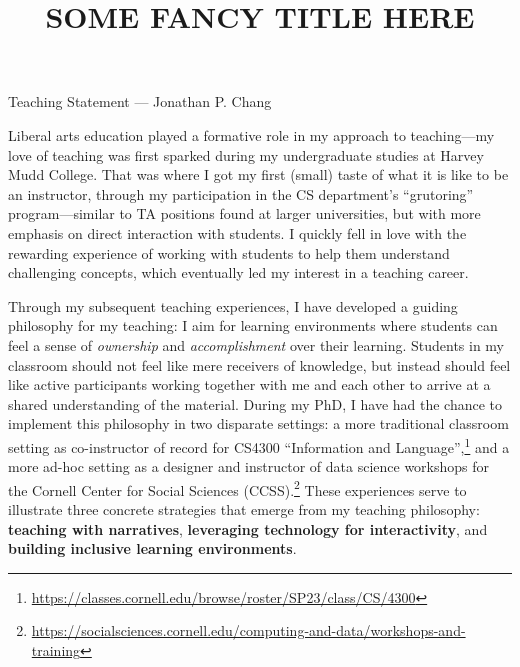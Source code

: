 \documentclass[12pt,letterpaper]{article}
\title{SOME FANCY TITLE HERE}
\begin{document}
\maketitle

{\centering Teaching Statement --- Jonathan P. Chang \par}

\vspace{0.5\baselineskip}
Liberal arts education played a formative role in my approach to teaching---my love of teaching was first sparked during my undergraduate studies at Harvey Mudd College.
That was where I got my first (small) taste of what it is like to be an instructor, through my participation in the CS department's ``grutoring'' program---similar to TA positions found at larger universities, but with more emphasis on direct interaction with students.
I quickly fell in love with the rewarding experience of working with students to help them understand challenging concepts, which eventually led my interest in a teaching career.

Through my subsequent teaching experiences, I have developed a guiding philosophy for my teaching: I aim for learning environments where students can feel a sense of \emph{ownership} and \emph{accomplishment} over their learning.
Students in my classroom should not feel like mere receivers of knowledge, but instead should feel like active participants working together with me and each other to arrive at a shared understanding of the material.
During my PhD, I have had the chance to implement this philosophy in two disparate settings: a more traditional classroom setting as co-instructor of record for CS4300 ``Information and Language'',\footnote{\url{https://classes.cornell.edu/browse/roster/SP23/class/CS/4300}} and a more ad-hoc setting as a designer and instructor of data science workshops for the Cornell Center for Social Sciences (CCSS).\footnote{\url{https://socialsciences.cornell.edu/computing-and-data/workshops-and-training}}
These experiences serve to illustrate three concrete strategies that emerge from my teaching philosophy: \textbf{teaching with narratives}, \textbf{leveraging technology for interactivity}, and \textbf{building inclusive learning environments}.
\end{document}
